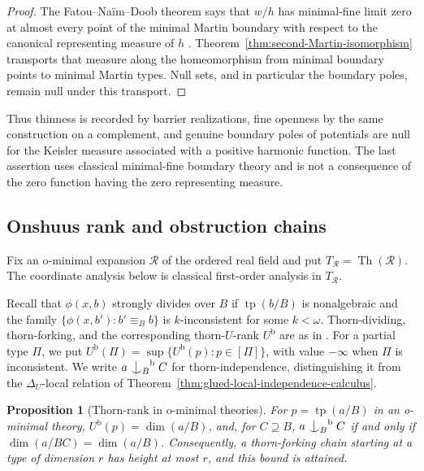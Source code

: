 \documentclass{amsart}
\newtheorem{proposition}[theorem]{Proposition}
\theoremstyle{definition}
\theoremstyle{remark}
\newcommand{\forkindep}[1][]{%
	\mathrel{
		\mathop{
			\vcenter{
				\hbox{\oalign{\noalign{\kern-.3ex}\hfil$\vert$\hfil\cr
						\noalign{\kern-.7ex}
						$\smile$\cr\noalign{\kern-.3ex}}}
			}
		}\displaylimits_{#1}
	}
}
\numberwithin{equation}{section}
\begin{document}
\begin{proof}
The Fatou--Na\"im--Doob theorem says that $w/h$ has minimal-fine limit zero at almost every point of the minimal Martin boundary with respect to the canonical representing measure of $h$ \cite[Theorem 8]{Gowrisankaran1966FND}. Theorem~\ref{thm:second-Martin-isomorphism} transports that measure along the homeomorphism from minimal boundary points to minimal Martin types. Null sets, and in particular the boundary poles, remain null under this transport.
\end{proof}

Thus thinness is recorded by barrier realizations, fine openness by the same construction on a complement, and genuine boundary poles of potentials are null for the Keisler measure associated with a positive harmonic function. The last assertion uses classical minimal-fine boundary theory and is not a consequence of the zero function having the zero representing measure.


\subsection{Onshuus rank and obstruction chains}
\label{subsec:Onshuus-rank-obstruction-chains}

Fix an o-minimal expansion $\mathcal R$ of the ordered real field and put
$T_{\mathcal R}=\operatorname{Th}(\mathcal R)$. The coordinate analysis below is classical
first-order analysis in $T_{\mathcal R}$.

Recall that $\phi(x,b)$ {strongly divides} over $B$ if
$\operatorname{tp}(b/B)$ is nonalgebraic and
the family $\{\phi(x,b'):b'\equiv_Bb\}$ is $k$-inconsistent for some $k<\omega$.
Thorn-dividing, thorn-forking, and the corresponding thorn-$U$-rank
$U^{\mathrm b}$ are as in \cite[Definitions~2.1 and~4.1]{Onshuus2006Thorn}.
For a partial type $\Pi$, we put
$U^{\mathrm b}(\Pi)=\sup\{U^{\mathrm b}(p):p\in[\Pi]\}$, with value
$-\infty$ when $\Pi$ is inconsistent. We write
$a\forkindep[B]^{\mathrm b}C$ for thorn-independence, distinguishing it
from the $\Delta_U$-local relation of
Theorem~\ref{thm:glued-local-independence-calculus}.

\begin{proposition}[Thorn-rank in o-minimal theories]
\label{prop:Onshuus-rank-equals-ominimal-dimension}
For $p=\operatorname{tp}(a/B)$ in an o-minimal theory, $U^{\mathrm b}(p)=\dim(a/B)$, and, for $C\supseteq B$, $a\forkindep[B]^{\mathrm b}C$
if and only if $\dim(a/BC)=\dim(a/B)$.
Consequently, a thorn-forking chain starting at a type of dimension $r$
has height at most $r$, and this bound is attained.
\end{proposition}
\end{document}
